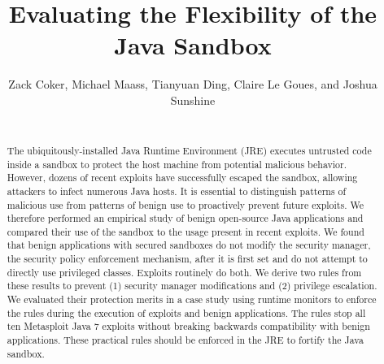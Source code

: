 \documentclass{sig-alternate}
\begin{document}
\lstset{language=Java}

\title{Evaluating the Flexibility of the Java Sandbox}

\author{\alignauthor Zack Coker, Michael Maass, Tianyuan Ding, Claire Le Goues, and Joshua Sunshine \\
 \\
} 

\maketitle
\thispagestyle{plain} 
\pagestyle{plain}
\begin{abstract}
The ubiquitously-installed Java Runtime Environment (JRE) executes
untrusted code inside a sandbox to protect the host machine from potential
malicious behavior. However, dozens of recent exploits have successfully
escaped the sandbox, allowing attackers to infect numerous
Java hosts. It is essential to distinguish patterns of malicious use
from patterns of benign use to proactively prevent future exploits.
We therefore performed an empirical study of benign open-source Java
applications and compared their use of the sandbox to the usage present
in recent exploits. We found that benign applications with secured
sandboxes do not modify the security manager, the security policy
enforcement mechanism, after it is first set and do not attempt to
directly use privileged classes. Exploits routinely do both. We derive 
two rules from these results to prevent (1) security manager 
modifications and (2) privilege escalation. We evaluated their protection merits 
in a case study using runtime monitors to enforce the rules during the 
execution of exploits and benign applications. The rules stop all ten 
Metasploit Java 7 exploits without breaking backwards compatibility 
with benign applications. These practical rules should be enforced 
in the JRE to fortify the Java sandbox.
\end{abstract}
\end{document}
